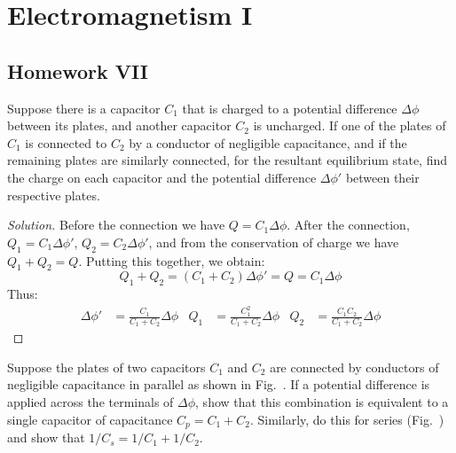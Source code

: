 \documentclass[crop=false,class=article,oneside]{standalone}
\begin{document}
    \ifx\ifphysicscourseselectromagnetismI\undefined
        \section*{Electromagnetism I}
        \setcounter{section}{7}
        \renewcommand\thefigure{%
            \arabic{section}.\arabic{figure}%
        }
        \renewcommand\thesubfigure{%
            \arabic{section}.\arabic{figure}.\arabic{subfigure}%
        }
    \fi
    \subsection{Homework VII}
        \begin{problem}[Wangsness 6-6]
            Suppose there is a capacitor $C_{1}$ that is charged
            to a potential difference $\Delta\phi$
            between its plates, and another capacitor
            $C_{2}$ is uncharged. If one of the plates
            of $C_{1}$ is connected to $C_{2}$ by
            a conductor of negligible capacitance, and
            if the remaining plates are similarly connected,
            for the resultant equilibrium state, find the
            charge on each capacitor and the potential
            difference $\Delta\phi'$ between their respective
            plates.
        \end{problem}
        \begin{proof}[Solution]
            Before the connection we have
            $Q=C_{1}\Delta\phi$.
            After the connection, $Q_{1}=C_{1}\Delta\phi'$,
            $Q_{2}=C_{2}\Delta\phi'$, and from the
            conservation of charge we have $Q_{1}+Q_{2}=Q$.
            Putting this together, we obtain:
            \begin{equation*}
                Q_{1}+Q_{2}
                =(C_{1}+C_{2})\Delta\phi'
                =Q
                =C_{1}\Delta\phi
            \end{equation*}
            Thus:
            \begin{align*}
                \Delta\phi'
                &=\frac{C_{1}}{C_{1}+C_{2}}\Delta\phi
                &
                Q_{1}
                &=\frac{C_{1}^{2}}{C_{1}+C_{2}}\Delta\phi
                &
                Q_{2}
                &=\frac{C_{1}C_{2}}{C_{1}+C_{2}}\Delta\phi
            \end{align*}
        \end{proof}
        \begin{problem}[Wangsness 6-7]
            \label{Problem:EMAG_Wangsness_6_7}
            Suppose the plates of two capacitors
            $C_{1}$ and $C_{2}$ are connected by conductors
            of negligible capacitance in parallel as shown
            in Fig.~.
            If a potential difference is applied across the
            terminals of $\Delta\phi$, show that this
            combination is equivalent to a single capacitor
            of capacitance $C_{p}=C_{1}+C_{2}$. Similarly, do
            this for series
            (Fig.~)
            and show that $1/C_{s}=1/C_{1}+1/C_{2}$.
        \end{problem}
\end{document}
